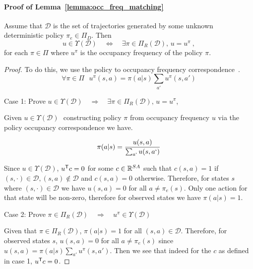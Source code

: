 \documentclass[11pt]{uai2023}
\begin{document}
\paragraph{Proof of Lemma~\ref{lemma:occ_freq_matching}}
Assume that $\mathcal{D}$ is the set of trajectories generated by some unknown deterministic policy $\pi_e \in \Pi_D$. Then
\[
	u \in \Upsilon (\mathcal{D})  \quad \Leftrightarrow \quad  \exists \pi \in \Pi_R(\mathcal{D}), \, u = u^{\pi}~,
\]
for each $\pi \in \Pi$ where $u^{\pi}$ is the occupancy frequency of the policy $\pi$.
\begin{proof}
	To do this, we use the policy to occupancy frequency correspondence~\cite{Puterman1994}.
	\[\forall \pi \in \Pi \,\,\,\, u^\pi(s,a) = \pi(a|s)\sum_{a'}{u^\pi(s,a')}\]

	Case 1: Prove $u \in \Upsilon (\mathcal{D})  \quad \Rightarrow \quad  \exists
		\pi \in \Pi_R(\mathcal{D}), \, u = u^{\pi}$,

	Given $u \in \Upsilon (\mathcal{D})\,\,$ constructing policy $\pi$ from
	occupancy frequency $u$ via the policy occupancy correspondence we have.

	\[\pi(a|s) = \frac{u(s,a)}{\sum_{a`}u(s,a`)}\]

	Since $u \in \Upsilon (\mathcal{D})$, $u^{\mathsf{T}} c = 0$ for some $c \in \mathbb{R}^{SA}$ such that
	$c(s,a) = 1$ if $(s,\cdot) \in \mathcal{D}, (s,a) \notin \mathcal{D}$ and $c(s,a) = 0$ otherwise.
	Therefore, for states $s$ where $(s,\cdot) \in \mathcal{D}$ we have $u(s,a) = 0$ for all $a \not= \pi_e(s)$.
	Only one action for that state will be non-zero, therefore for observed states we have $\pi(a|s) = 1$.

	Case 2: Prove $\pi \in \Pi_R(\mathcal{D}) \quad \Rightarrow \quad  u^\pi \in
		\Upsilon (\mathcal{D})$

	Given that $\pi \in \Pi_R(\mathcal{D})$, $\pi(a|s) = 1$ for all $(s,a) \in \mathcal{D}$. Therefore, for observed states $s$, $u(s,a) = 0$ for all $a \not= \pi_e(s)$
	since $u(s,a) = \pi(a|s)\sum_{a'}{u^\pi(s,a')}$. Then we see that indeed for the $c$ as defined in case 1, $u^{\mathsf{T}} c = 0$.
\end{proof}
\end{document}
